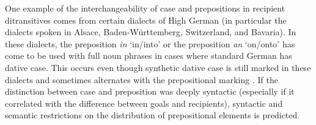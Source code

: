 	One example of the interchangeability of case and prepositions in recipient ditransitives comes from certain dialects of High German (in particular the dialects spoken in Alsace, Baden-Württemberg, Switzerland, and Bavaria). In these dialects, the preposition \textit{in} `in/into' or the preposition \textit{an} `on/onto' has come to be used with full noun phrases in cases where standard German has dative case. This occurs even though synthetic dative case is still marked in these dialects and sometimes alternates with the prepositional marking \citep{Seiler.2001,Seiler.2003}. If the distinction between case and preposition was deeply syntactic (especially if it correlated with the difference between goals and recipients), syntactic and semantic restrictions on the distribution of prepositional elements is predicted. 
	
